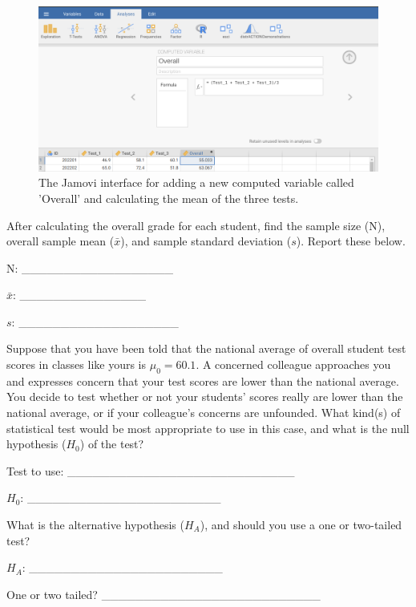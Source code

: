 \documentclass[
]{scrbook}
\begin{document}
\begin{figure}
\includegraphics[width=1\linewidth]{img/jamovi_students_overall} \caption{The Jamovi interface for adding a new computed variable called 'Overall' and calculating the mean of the three tests.}\label{fig:unnamed-chunk-100}
\end{figure}

After calculating the overall grade for each student, find the sample size (N), overall sample mean (\(\bar{x}\)), and sample standard deviation (\(s\)).
Report these below.

N: \_\_\_\_\_\_\_\_\_\_\_\_\_\_\_\_\_\_

\(\bar{x}\): \_\_\_\_\_\_\_\_\_\_\_\_\_\_\_

\(s\): \_\_\_\_\_\_\_\_\_\_\_\_\_\_\_\_\_\_\_

Suppose that you have been told that the national average of overall student test scores in classes like yours is \(\mu_{0} = 60.1\).
A concerned colleague approaches you and expresses concern that your test scores are lower than the national average.
You decide to test whether or not your students' scores really are lower than the national average, or if your colleague's concerns are unfounded.
What kind(s) of statistical test would be most appropriate to use in this case, and what is the null hypothesis (\(H_{0}\)) of the test?

Test to use: \_\_\_\_\_\_\_\_\_\_\_\_\_\_\_\_\_\_\_\_\_\_\_\_\_\_\_

\(H_{0}\): \_\_\_\_\_\_\_\_\_\_\_\_\_\_\_\_\_\_\_\_\_\_\_

What is the alternative hypothesis (\(H_{A}\)), and should you use a one or two-tailed test?

\(H_{A}\): \_\_\_\_\_\_\_\_\_\_\_\_\_\_\_\_\_\_\_\_\_\_\_

One or two tailed? \_\_\_\_\_\_\_\_\_\_\_\_\_\_\_\_\_\_\_\_\_\_\_\_\_\_
\end{document}
